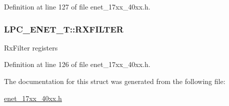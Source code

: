 Definition at line 127 of file enet\+\_\+17xx\+\_\+40xx.\+h.

\subsubsection[{\texorpdfstring{R\+X\+F\+I\+L\+T\+ER}{RXFILTER}}]{ L\+P\+C\+\_\+\+E\+N\+E\+T\+\_\+\+T\+::\+R\+X\+F\+I\+L\+T\+ER}\hypertarget{structLPC__ENET__T_a4076c6a080ba8b6e6e7af7343408080b}{}\label{structLPC__ENET__T_a4076c6a080ba8b6e6e7af7343408080b}
Rx\+Filter registers 

Definition at line 126 of file enet\+\_\+17xx\+\_\+40xx.\+h.



The documentation for this struct was generated from the following file\+:\begin{DoxyCompactItemize}
\item 
\hyperlink{enet__17xx__40xx_8h}{enet\+\_\+17xx\+\_\+40xx.\+h}\end{DoxyCompactItemize}
